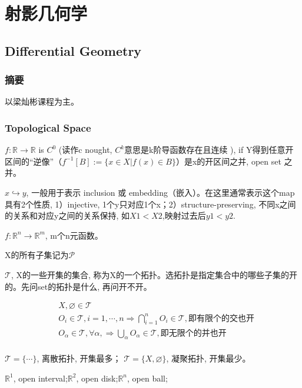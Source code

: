 \documentclass[UTF8]{../09-Mathematics}
\begin{document}
\chapter{射影几何学}




\section{Differential Geometry}
\subsection{摘要}
以梁灿彬课程为主。


\subsection{Topological Space}


$f: \mathbb{R} \to \mathbb{R} $ is $C^0$ (读作c nought, $C^k$意思是k阶导函数存在且连续 ),  if Y得到任意开区间的“逆像”（$f^{-1}[B] := \{x \in X | f(x) \in B\}$）是x的开区间之并, open set 之并。

$x \hookrightarrow y$, 一般用于表示 inclusion 或 embedding（嵌入）。在这里通常表示这个map具有2个性质, 1）injective, 1个y只对应1个x；2）structure-preserving, 不同x之间的关系和对应y之间的关系保持, 如$X1 < X2$,映射过去后$y1 < y2$.

$f: \mathbb{R}^n \to \mathbb{R}^m $,  m个n元函数。

X的所有子集记为$\mathscr P$

$\mathscr T$, X的一些开集的集合, 称为X的一个拓扑。选拓扑是指定集合中的哪些子集的开的。先问set的拓扑是什么, 再问开不开。

\begin{equation}
    \begin{split}
    &X, \varnothing \in \mathscr T\\
    &O_i \in\mathscr T, i=1, \cdots, n \Longrightarrow \bigcap _{i=1}^n O_i  \in\mathscr T, 即有限个的交也开 \\
    &O_\alpha \in\mathscr T, \forall \alpha, \Longrightarrow \bigcup  _\alpha  O_\alpha \in\mathscr T,  即无限个的并也开 \\
    \end{split}
  \end{equation}


$\mathscr T = \{ \cdots \}$, 离散拓扑, 开集最多；
$\mathscr T = \{ X, \varnothing \}$, 凝聚拓扑, 开集最少。

$\mathbb{R}^1$, open interval;$\mathbb{R}^2$, open disk;$\mathbb{R}^n$, open ball;
\end{document}
